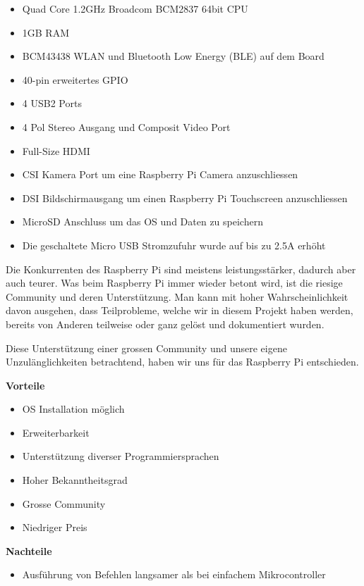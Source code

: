 \documentclass[a4paper]{report}
\begin{document}
\begin{itemize}[noitemsep]
	\item Quad Core 1.2GHz Broadcom BCM2837 64bit CPU
	\item 1GB RAM
	\item BCM43438 WLAN und Bluetooth Low Energy (BLE) auf dem Board
	\item 40-pin erweitertes GPIO
	\item 4 USB2 Ports
	\item 4 Pol Stereo Ausgang und Composit Video Port
	\item Full-Size HDMI
	\item CSI Kamera Port um eine Raspberry Pi Camera anzuschliessen
	\item DSI Bildschirmausgang um einen Raspberry Pi Touchscreen anzuschliessen
	\item MicroSD Anschluss um das OS und Daten zu speichern
	\item Die geschaltete Micro USB Stromzufuhr wurde auf bis zu 2.5A erhöht
\end{itemize}\parencite{RaspberryPiFoundation2017}


Die Konkurrenten des Raspberry Pi sind meistens leistungsstärker, dadurch aber auch teurer. Was beim Raspberry Pi immer wieder betont wird, ist die riesige Community und deren Unterstützung. Man kann mit hoher Wahrscheinlichkeit davon ausgehen, dass Teilprobleme, welche wir in diesem Projekt haben werden, bereits von Anderen teilweise oder ganz gelöst und dokumentiert wurden.

Diese Unterstützung einer grossen Community und unsere eigene Unzulänglichkeiten betrachtend, haben wir uns für das Raspberry Pi entschieden.

\begin{multicols}{2}
	\textbf{Vorteile}
	\begin{itemize}[label={+},noitemsep]
		\item OS Installation möglich
		\item Erweiterbarkeit
		\item Unterstützung diverser Programmiersprachen
		\item Hoher Bekanntheitsgrad
		\item Grosse Community
		\item Niedriger Preis
	\end{itemize}
	\columnbreak
	\textbf{Nachteile}
	\begin{itemize}[label={-},noitemsep]
		\item Ausführung von Befehlen langsamer als bei einfachem Mikrocontroller
	\end{itemize}
\end{multicols}
\end{document}
